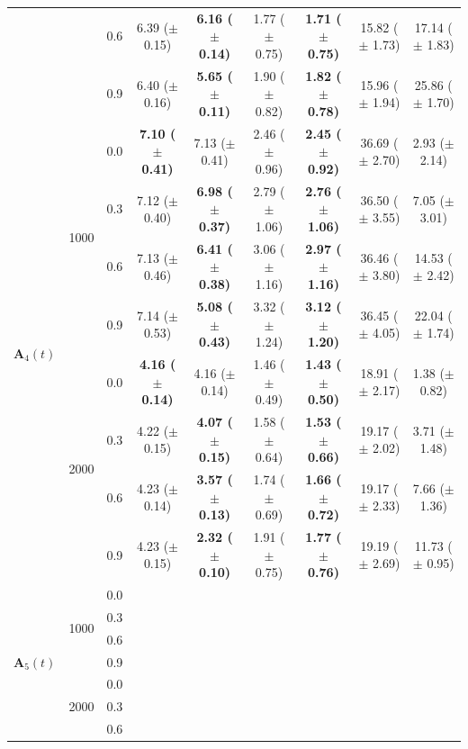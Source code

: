 \begin{table}[htbp]
{\begin{tabular}{lll|cc|cc|cc}
 &  & 0.6 & 6.39 ($\pm$ 0.15) & \textbf{6.16 ($\pm$ 0.14)} & 1.77 ($\pm$ 0.75) & \textbf{1.71 ($\pm$ 0.75)} & 15.82 ($\pm$ 1.73) & 17.14 ($\pm$ 1.83) \\
 &  & 0.9 & 6.40 ($\pm$ 0.16) & \textbf{5.65 ($\pm$ 0.11)} & 1.90 ($\pm$ 0.82) & \textbf{1.82 ($\pm$ 0.78)} & 15.96 ($\pm$ 1.94) & 25.86 ($\pm$ 1.70) \\
\hline
\multirow{8}{*}{$\mathbf{A}_4(t)$} & \multirow{4}{*}{1000} & 0.0 & \textbf{7.10 ($\pm$ 0.41)} & 7.13 ($\pm$ 0.41) & 2.46 ($\pm$ 0.96) & \textbf{2.45 ($\pm$ 0.92)} & 36.69 ($\pm$ 2.70) & 2.93 ($\pm$ 2.14) \\
 &  & 0.3 & 7.12 ($\pm$ 0.40) & \textbf{6.98 ($\pm$ 0.37)} & 2.79 ($\pm$ 1.06) & \textbf{2.76 ($\pm$ 1.06)} & 36.50 ($\pm$ 3.55) & 7.05 ($\pm$ 3.01) \\
 &  & 0.6 & 7.13 ($\pm$ 0.46) & \textbf{6.41 ($\pm$ 0.38)} & 3.06 ($\pm$ 1.16) & \textbf{2.97 ($\pm$ 1.16)} & 36.46 ($\pm$ 3.80) & 14.53 ($\pm$ 2.42) \\
 &  & 0.9 & 7.14 ($\pm$ 0.53) & \textbf{5.08 ($\pm$ 0.43)} & 3.32 ($\pm$ 1.24) & \textbf{3.12 ($\pm$ 1.20)} & 36.45 ($\pm$ 4.05) & 22.04 ($\pm$ 1.74) \\
\cline{2-9}
 & \multirow{4}{*}{2000} & 0.0 & \textbf{4.16 ($\pm$ 0.14)} & 4.16 ($\pm$ 0.14) & 1.46 ($\pm$ 0.49) & \textbf{1.43 ($\pm$ 0.50)} & 18.91 ($\pm$ 2.17) & 1.38 ($\pm$ 0.82) \\
 &  & 0.3 & 4.22 ($\pm$ 0.15) & \textbf{4.07 ($\pm$ 0.15)} & 1.58 ($\pm$ 0.64) & \textbf{1.53 ($\pm$ 0.66)} & 19.17 ($\pm$ 2.02) & 3.71 ($\pm$ 1.48) \\
 &  & 0.6 & 4.23 ($\pm$ 0.14) & \textbf{3.57 ($\pm$ 0.13)} & 1.74 ($\pm$ 0.69) & \textbf{1.66 ($\pm$ 0.72)} & 19.17 ($\pm$ 2.33) & 7.66 ($\pm$ 1.36) \\
 &  & 0.9 & 4.23 ($\pm$ 0.15) & \textbf{2.32 ($\pm$ 0.10)} & 1.91 ($\pm$ 0.75) & \textbf{1.77 ($\pm$ 0.76)} & 19.19 ($\pm$ 2.69) & 11.73 ($\pm$ 0.95) \\
\hline
\multirow{8}{*}{$\mathbf{A}_5(t)$} & \multirow{4}{*}{1000} & 0.0 &  &  &  &  &  &  \\
 &  & 0.3 &  &  &  &  &  &  \\
 &  & 0.6 &  &  &  &  &  &  \\
 &  & 0.9 &  &  &  &  &  &  \\
\cline{2-9}
 & \multirow{4}{*}{2000} & 0.0 &  &  &  &  &  &  \\
 &  & 0.3 &  &  &  &  &  &  \\
 &  & 0.6 &  &  &  &  &  &  \\

\end{tabular}}
\end{table}
